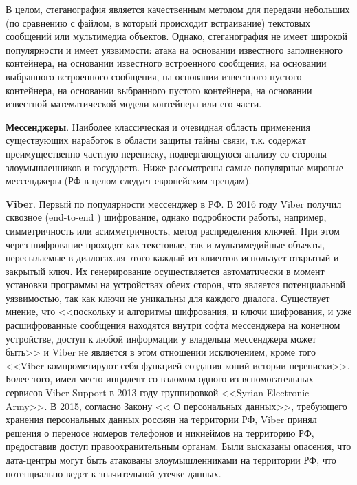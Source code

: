 В целом, стеганография является качественным методом для передачи небольших (по сравнению с файлом, в который происходит встраивание) текстовых сообщений или мультимедиа объектов. Однако, стеганография не имеет широкой популярности и имеет уязвимости: атака на основании известного заполненного контейнера,  на основании известного встроенного сообщения,  на основании выбранного встроенного сообщения, на основании известного пустого контейнера, на основании выбранного пустого контейнера, на основании известной математической модели контейнера или его части.

\textbf{Мессенджеры}. Наиболее классическая и очевидная область применения существующих наработок в области защиты тайны связи, т.к. содержат преимущественно частную переписку, подвергающуюся анализу со стороны злоумышленников и государств.  Ниже рассмотрены самые популярные мировые мессенджеры (РФ в целом следует европейским трендам). %

\textbf{Viber}. Первый по популярности мессенджер  в РФ. В 2016 году Viber получил сквозное (end-to-end ) шифрование, однако подробности работы, например, симметричность или асимметричность, метод распределения ключей.  При этом через шифрование проходят как текстовые, так и мультимедийные объекты, пересылаемые в диалогах.ля этого каждый из клиентов использует открытый и закрытый ключ. Их генерирование осуществляется автоматически в момент установки программы на устройствах обеих сторон, что является потенциальной уязвимостью, так как ключи не уникальны для каждого диалога.%
Существует мнение, что <<поскольку и алгоритмы шифрования, и ключи шифрования, и уже расшифрованные сообщения находятся внутри софта мессенджера на конечном устройстве, доступ к любой информации у владельца мессенджера может быть>> и Viber не является в этом отношении исключением, кроме того <<Viber компрометируют себя функцией создания копий истории переписки>>. %
Более того, имел место инцидент со взломом одного из вспомогательных сервисов Viber Support в 2013 году группировкой <<Syrian Electronic Army>>. %
В 2015, согласно Закону << О персональных данных>>, требующего хранения персональных данных россиян на территории РФ, Viber принял решения о переносе номеров телефонов и никнеймов на территорию РФ, предоставив доступ правоохранительным органам. Были высказаны опасения, что дата-центры могут быть атакованы злоумышленниками на территории РФ, что потенциально ведет к значительной утечке данных. %


